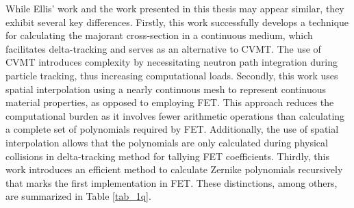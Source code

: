 While Ellis' work and the work presented in this thesis may appear similar, they exhibit several key differences. Firstly, this work successfully develops a technique for calculating the majorant cross-section in a continuous medium, which facilitates delta-tracking and serves as an alternative to CVMT. The use of CVMT introduces complexity by necessitating neutron path integration during particle tracking, thus increasing computational loads. Secondly, this work uses spatial interpolation using a nearly continuous mesh to represent continuous material properties, as opposed to employing FET. This approach reduces the computational burden as it involves fewer arithmetic operations than calculating a complete set of polynomials required by FET. Additionally, the use of spatial interpolation allows that the polynomials are only calculated during physical collisions in delta-tracking method for tallying FET coefficients. Thirdly,  this work introduces an efficient method \cite{honarvar} to calculate Zernike polynomials recursively that marks the first implementation in FET. These distinctions, among others, are summarized in Table \ref{tab_1q}.

